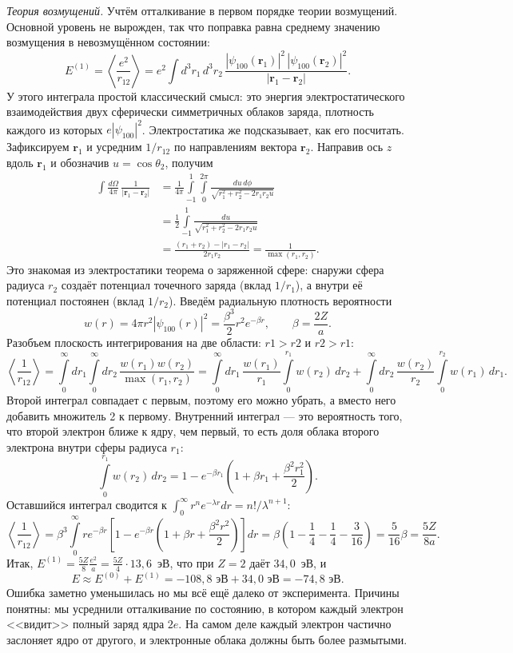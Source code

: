\textit{Теория возмущений.} Учтём отталкивание в первом порядке теории
возмущений. Основной уровень не вырожден, так что поправка равна среднему
значению возмущения в невозмущённом состоянии:
\[
  E^{(1)} = \left\langle \frac{e^2}{r_{12}} \right\rangle =
  e^2\int d^3r_1\, d^3r_2\,
  \frac{|\psi_{100}(\mathbf{r}_1)|^2\,|\psi_{100}(\mathbf{r}_2)|^2}{|\mathbf{r}_1 - \mathbf{r}_2|}.
\]
У этого интеграла простой классический смысл: это энергия электростатического
взаимодействия двух сферически симметричных облаков заряда, плотность каждого
из которых $e|\psi_{100}|^2$. Электростатика же подсказывает, как его
посчитать. Зафиксируем $\mathbf{r}_1$ и усредним $1/r_{12}$ по направлениям
вектора $\mathbf{r}_2$. Направив ось $z$ вдоль $\mathbf{r}_1$ и обозначив $u =
  \cos\theta_2$, получим
\begin{align*}
  \int\frac{d\Omega}{4\pi}\,\frac{1}{|\mathbf{r}_1 - \mathbf{r}_2|}
  &= \frac{1}{4\pi}\int\limits_{-1}^{1}\int\limits_{0}^{2\pi}
  \frac{du\,d\phi}{\sqrt{r_1^2 + r_2^2 - 2r_1r_2u}}\\
  &= \frac{1}{2}\int\limits_{-1}^{1}\frac{du}{\sqrt{r_1^2 + r_2^2 - 2r_1r_2u}}\\
  &= \frac{(r_1 + r_2) - |r_1 - r_2|}{2r_1r_2} = \frac{1}{\max(r_1, r_2)}.
\end{align*}
Это знакомая из электростатики теорема о заряженной сфере: снаружи сфера
радиуса $r_2$ создаёт потенциал точечного заряда (вклад $1/r_1$), а внутри её
потенциал постоянен (вклад $1/r_2$). Введём радиальную плотность вероятности
\[
  w(r) = 4\pi r^2|\psi_{100}(r)|^2 = \frac{\beta^3}{2}r^2e^{-\beta r},\qquad
  \beta = \frac{2Z}{a}.
\]
Разобъем плоскость интегрирования на две области: $r1>r2$ и $r2>r1$:
\[
  \left\langle \frac{1}{r_{12}} \right\rangle
  = \int\limits_0^\infty dr_1 \int\limits_0^\infty dr_2\,
  \frac{w(r_1)w(r_2)}{\max(r_1, r_2)}
  = \int\limits_0^{\infty}dr_1\,\frac{w(r_1)}{r_1}\int\limits_0^{r_1}w(r_2)\,dr_2
  + \int\limits_0^{\infty}dr_2\,\frac{w(r_2)}{r_2}\int\limits_0^{r_2}w(r_1)\,dr_1.
\]
Второй интеграл совпадает с первым, поэтому его можно убрать, а вместо него
добавить множитель 2 к первому. Внутренний интеграл --- это вероятность того,
что второй электрон ближе к ядру, чем первый, то есть доля облака второго
электрона внутри сферы радиуса $r_1$:
\[
  \int\limits_0^{r_1}w(r_2)\,dr_2 = 1 - e^{-\beta r_1}\left(1 + \beta r_1 +
  \frac{\beta^2r_1^2}{2}\right).
\]
Оставшийся интеграл сводится к $\int_0^\infty r^ne^{-\lambda r}dr =
  n!/\lambda^{n+1}$:
\[
  \left\langle \frac{1}{r_{12}} \right\rangle = \beta^3\int\limits_0^\infty
  re^{-\beta r}\left[1 - e^{-\beta r}\left(1 + \beta r +
    \frac{\beta^2r^2}{2}\right)\right]dr = \beta\left(1 - \frac14 - \frac14 -
  \frac{3}{16}\right) = \frac{5}{16}\beta = \frac{5Z}{8a}.
\]
Итак, $E^{(1)} = \frac{5Z}{8}\frac{e^2}{a} = \frac{5Z}{4}\cdot 13{,}6$~эВ, что
при $Z = 2$ даёт $34{,}0$~эВ, и
\[
  E \approx E^{(0)} + E^{(1)} = -108{,}8\text{~эВ} + 34{,}0\text{~эВ} =
  -74{,}8\text{~эВ}.
\]
Ошибка заметно уменьшилась но мы всё ещё далеко от эксперимента. Причины
понятны: мы усреднили отталкивание по состоянию, в котором каждый электрон
<<видит>> полный заряд ядра $2e$. На самом деле каждый электрон частично
заслоняет ядро от другого, и электронные облака должны быть более размытыми.

